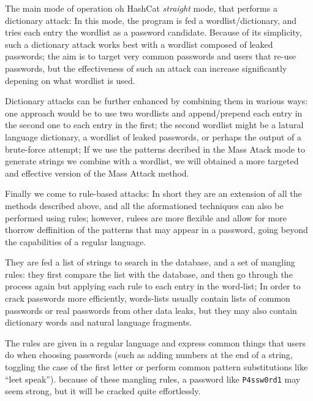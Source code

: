 The main mode of operation oh HashCat \emph{straight} mode, that performs a dictionary attack: In this mode, the program is fed a wordlist/dictionary, and tries each entry the wordlist as a password candidate. Because of its simplicity, such a dictionary attack works best with a wordlist composed of leaked passwords; the aim is to target very common passwords and users that re-use passwords, but the effectiveness of such an attack can increase significantly depening on what wordlist is used.

Dictionary attacks can be further enhanced by combining them in warious ways: one approach would be to use two wordlists and append/prepend each entry in the second one to each entry in the first; the second wordlist might be a latural language dictionary, a wordlist of leaked passwords, or perhaps the output of a brute-force attempt; If we use the patterns decribed in the Mass Atack mode to generate strings we combine with a wordlist, we will obtained a more targeted and effective version of the Mass Attack method. \newpage

Finally we come to rule-based attacks: In short they are an extension of all the methods described above, and all the aformationed techniques can also be performed using rules; however, rulees are more flexible and allow for more thorrow deffinition of the patterns that may appear in a password, going beyond the capabilities of a regular language.
 
\cleardoublepage
They are fed a list of strings to search in the database, and a set of mangling rules: they first compare the list with the database, and then go through the process again but applying each rule to each entry in the word-list; In order to crack passwords more efficiently, words-lists usually contain lists of common passwords or real passwords from other data leaks, but they may also contain dictionary words and natural language fragments.

The rules are given in a regular language and express common things that users do when choosing passwords (such as adding numbers at the end of a string, toggling the case of the first letter or perform common pattern substitutions like \enquote{leet speak}). because of these mangling rules, a password like \texttt{P4ssw0rd1} may seem strong, but it will be cracked quite effortlessly.
